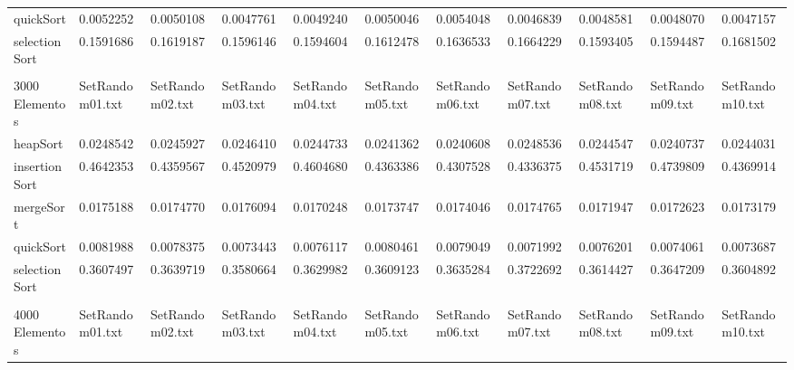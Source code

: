 \documentclass[article,a4paper]{article}
\begin{document}
\begin{table}[h]
{\begin{tabular}{lllllllllll}
quickSort       & 0.0052252       & 0.0050108       & 0.0047761       & 0.0049240       & 0.0050046       & 0.0054048       & 0.0046839       & 0.0048581       & 0.0048070       & 0.0047157       \\
selectionSort   & 0.1591686       & 0.1619187       & 0.1596146       & 0.1594604       & 0.1612478       & 0.1636533       & 0.1664229       & 0.1593405       & 0.1594487       & 0.1681502       \\
                &                 &                 &                 &                 &                 &                 &                 &                 &                 &                 \\
3000 Elementos  & SetRandom01.txt & SetRandom02.txt & SetRandom03.txt & SetRandom04.txt & SetRandom05.txt & SetRandom06.txt & SetRandom07.txt & SetRandom08.txt & SetRandom09.txt & SetRandom10.txt \\
heapSort        & 0.0248542       & 0.0245927       & 0.0246410       & 0.0244733       & 0.0241362       & 0.0240608       & 0.0248536       & 0.0244547       & 0.0240737       & 0.0244031       \\
insertionSort   & 0.4642353       & 0.4359567       & 0.4520979       & 0.4604680       & 0.4363386       & 0.4307528       & 0.4336375       & 0.4531719       & 0.4739809       & 0.4369914       \\
mergeSort       & 0.0175188       & 0.0174770       & 0.0176094       & 0.0170248       & 0.0173747       & 0.0174046       & 0.0174765       & 0.0171947       & 0.0172623       & 0.0173179       \\
quickSort       & 0.0081988       & 0.0078375       & 0.0073443       & 0.0076117       & 0.0080461       & 0.0079049       & 0.0071992       & 0.0076201       & 0.0074061       & 0.0073687       \\
selectionSort   & 0.3607497       & 0.3639719       & 0.3580664       & 0.3629982       & 0.3609123       & 0.3635284       & 0.3722692       & 0.3614427       & 0.3647209       & 0.3604892       \\
                &                 &                 &                 &                 &                 &                 &                 &                 &                 &                 \\
4000 Elementos  & SetRandom01.txt & SetRandom02.txt & SetRandom03.txt & SetRandom04.txt & SetRandom05.txt & SetRandom06.txt & SetRandom07.txt & SetRandom08.txt & SetRandom09.txt & SetRandom10.txt \\

\end{tabular}}
\end{table}
\end{document}
